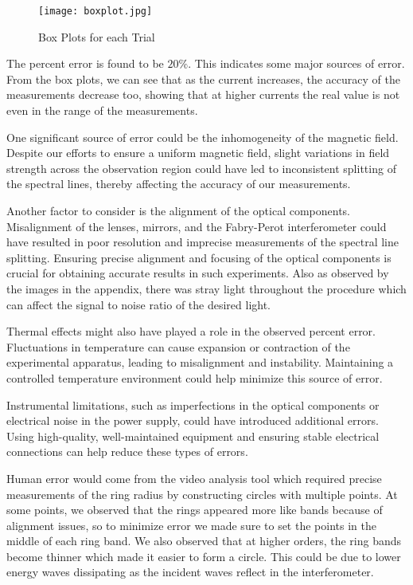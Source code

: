 \documentclass[11pt]{article}
\begin{document}
\clearpage
	
	\begin{figure}[htbp]
		\centering
		\caption{Box Plots for each Trial}
		\texttt{[image: boxplot.jpg]}
	\end{figure}
	
	The percent error is found to be $20\%$. This indicates some major sources of error. From the box plots, we can see that as the current increases, the accuracy of the measurements decrease too, showing that at higher currents the real value is not even in the range of the measurements.
	
	One significant source of error could be the inhomogeneity of the magnetic field. Despite our efforts to ensure a uniform magnetic field, slight variations in field strength across the observation region could have led to inconsistent splitting of the spectral lines, thereby affecting the accuracy of our measurements.
	
	Another factor to consider is the alignment of the optical components. Misalignment of the lenses, mirrors, and the Fabry-Perot interferometer could have resulted in poor resolution and imprecise measurements of the spectral line splitting. Ensuring precise alignment and focusing of the optical components is crucial for obtaining accurate results in such experiments. Also as observed by the images in the appendix, there was stray light throughout the procedure which can affect the signal to noise ratio of the desired light.
	
	Thermal effects might also have played a role in the observed percent error. Fluctuations in temperature can cause expansion or contraction of the experimental apparatus, leading to misalignment and instability. Maintaining a controlled temperature environment could help minimize this source of error.
	
	Instrumental limitations, such as imperfections in the optical components or electrical noise in the power supply, could have introduced additional errors. Using high-quality, well-maintained equipment and ensuring stable electrical connections can help reduce these types of errors.
	
	Human error would come from the video analysis tool which required precise measurements of the ring radius by constructing circles with multiple points. At some points, we observed that the rings appeared more like bands because of alignment issues, so to minimize error we made sure to set the points in the middle of each ring band. We also observed that at higher orders, the ring bands become thinner which made it easier to form a circle. This could be due to lower energy waves dissipating as the incident waves reflect in the interferometer.
	
\end{document}
